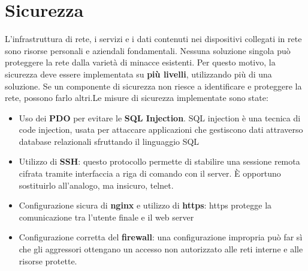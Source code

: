 
\section{Sicurezza}
L'infrastruttura di rete, i servizi e i dati contenuti nei dispositivi collegati in rete sono risorse personali e aziendali fondamentali. Nessuna soluzione singola può proteggere la rete dalla varietà di minacce esistenti. Per questo motivo, la sicurezza deve essere implementata su \textbf{più livelli}, utilizzando più di una soluzione. Se un componente di sicurezza non riesce a identificare e proteggere la rete, possono farlo altri.\clearpage Le misure di sicurezza implementate sono state:
\begin{itemize}
    \item Uso dei \textbf{PDO} per evitare le \textbf{SQL Injection}. SQL injection è una tecnica di code injection, usata per attaccare applicazioni che gestiscono dati attraverso database relazionali sfruttando il linguaggio SQL \cite{sql_injection_php}
    \item Utilizzo di \textbf{SSH}: questo protocollo permette di stabilire una sessione remota cifrata tramite interfaccia a riga di comando con il server. È opportuno sostituirlo all'analogo, ma insicuro, telnet.
    \item Configurazione sicura di \textbf{nginx} e utilizzo di \textbf{https}: https protegge la comunicazione tra l'utente finale e il web server
    \item Configurazione corretta del \textbf{firewall}: una configurazione impropria può far sì che gli aggressori ottengano un accesso non autorizzato alle reti interne e alle risorse protette.
\end{itemize}

